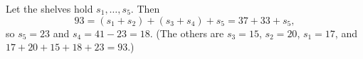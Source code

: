 Let the shelves hold $s_1,\dots,s_5$. Then
\[93=(s_1+s_2)+(s_3+s_4)+s_5=37+33+s_5,\]
so $s_5=23$ and $s_4=41-23=\boxed{18}$. (The others are $s_3=15$, $s_2=20$, $s_1=17$, and $17+20+15+18+23=93$.)
